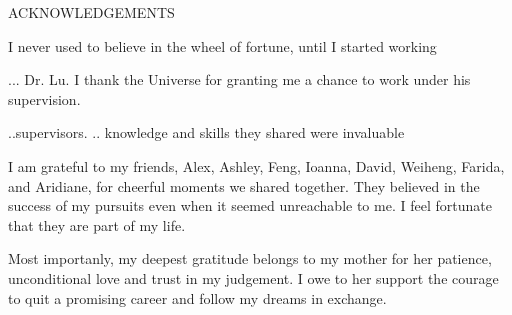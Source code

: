\newpage
{}

\begin{center}
ACKNOWLEDGEMENTS
\end{center}

I never used to believe in the wheel of fortune, until I started working 


... Dr. Lu. I thank the Universe for granting me a chance to work under his supervision.

..supervisors. .. knowledge and skills they shared were invaluable

I am grateful to my friends,  Alex, Ashley, Feng, Ioanna, David, Weiheng,  Farida, and Aridiane, 
 for cheerful moments we shared together. They believed in the success of my  pursuits even when it seemed unreachable to me. I feel fortunate that they are part of my life. 

Most importanly, my deepest gratitude belongs to my mother for her patience, unconditional love and trust in my judgement. %
I owe to her support the courage to quit a promising career and follow my dreams in exchange.
%
%
